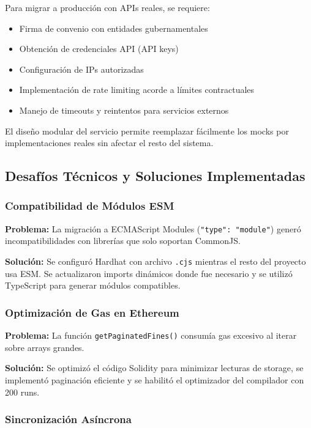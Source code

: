 Para migrar a producción con APIs reales, se requiere:
\begin{itemize}
    \item Firma de convenio con entidades gubernamentales
    \item Obtención de credenciales API (API keys)
    \item Configuración de IPs autorizadas
    \item Implementación de rate limiting acorde a límites contractuales
    \item Manejo de timeouts y reintentos para servicios externos
\end{itemize}

El diseño modular del servicio permite reemplazar fácilmente los mocks por implementaciones reales sin afectar el resto del sistema.

\subsection{Desafíos Técnicos y Soluciones Implementadas}

\subsubsection{Compatibilidad de Módulos ESM}

\textbf{Problema:} La migración a ECMAScript Modules (\texttt{"type": "module"}) generó incompatibilidades con librerías que solo soportan CommonJS.

\textbf{Solución:} Se configuró Hardhat con archivo \texttt{.cjs} mientras el resto del proyecto usa ESM. Se actualizaron imports dinámicos donde fue necesario y se utilizó TypeScript para generar módulos compatibles.

\subsubsection{Optimización de Gas en Ethereum}

\textbf{Problema:} La función \texttt{getPaginatedFines()} consumía gas excesivo al iterar sobre arrays grandes.

\textbf{Solución:} Se optimizó el código Solidity para minimizar lecturas de storage, se implementó paginación eficiente y se habilitó el optimizador del compilador con 200 runs.

\subsubsection{Sincronización Asíncrona}

